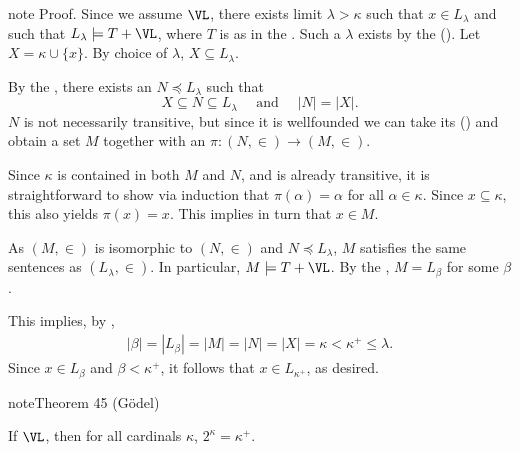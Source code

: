 \documentclass[letterpaper,10pt,english]{jupyterBook}
\begin{document}
\begin{sphinxadmonition}{note}
\sphinxAtStartPar
Proof. Since we assume \(\VL\), there exists limit \(\lambda > \kappa\) such that \(x \in L_\lambda\) and such that \(L_\lambda \models T + \VL\), where \(T\) is as in the . Such a \(\lambda\) exists by the  ({\hyperref[\detokenize{constructible:thm-reflection}]{}}).  Let \(X = \kappa \cup \{x\}\). By choice of \(\lambda\), \(X \subseteq L_\lambda\).

\sphinxAtStartPar
By the , there exists an  \(N \preceq L_\lambda\) such that
\begin{equation*} \tag{$*$}
    X \subseteq N \subseteq L_\lambda \quad \text{ and } \quad |N| = |X|.
\end{equation*}
\sphinxAtStartPar
\(N\) is not necessarily transitive, but since it is well\sphinxhyphen{}founded we can take its  ({\hyperref[\detokenize{models:thm-Mostowski-collapse}]{}}) and obtain a  set \(M\)
together with an  \(\pi: (N,\in) \to (M,\in)\).

\sphinxAtStartPar
Since \(\kappa\) is contained in both \(M\) and \(N\), and is already transitive, it is straightforward to show via induction that \(\pi(\alpha) = \alpha\) for all \(\alpha \in \kappa\). Since \(x \subseteq \kappa\), this also yields \(\pi(x) = x\). This implies in turn that \(x \in M\).

\sphinxAtStartPar
As \((M,\in)\) is isomorphic to \((N,\in)\) and \(N \preceq L_\lambda\), \(M\) satisfies the same sentences as \((L_\lambda, \in)\). In particular, \(M \models T + \VL\). By the , \(M = L_\beta\) for some \(\beta\).

\sphinxAtStartPar
This implies, by {\hyperref[\detokenize{V=L:prop-card-Lalpha}]{}},
\begin{equation*}
\begin{split}  
    |\beta| = |L_\beta| = |M| = |N| = |X| = \kappa < \kappa^+ \leq \lambda.
\end{split}
\end{equation*}
\sphinxAtStartPar
Since \(x \in L_\beta\) and \(\beta < \kappa^+\), it follows that \(x \in L_{\kappa^+}\), as desired.
\end{sphinxadmonition}
\label{V=L:thm-L-GCH}
\begin{sphinxadmonition}{note}{Theorem 45 (Gödel)}



\sphinxAtStartPar
If \(\VL\), then for all cardinals \(\kappa\), \(2^\kappa = \kappa^+\).
\end{sphinxadmonition}
\end{document}
